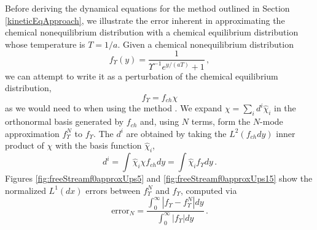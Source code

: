 \label{basisComparison}
Before deriving the dynamical equations for the method outlined in Section \ref{kineticEqApproach}, we illustrate the error inherent in approximating the chemical nonequilibrium distribution   with a  chemical equilibrium distribution  whose temperature is $T=1/a$.   Given a chemical nonequilibrium distribution 
\begin{equation}\label{zerothApprox}
f_\Upsilon (y)=\frac{1}{\Upsilon^{-1}e^{y/(aT)}+1}\,,
\end{equation}
 we can attempt to write it as a perturbation of the chemical equilibrium distribution,  
\begin{equation}\label{chiDef}
f_\Upsilon=f_{ch}\chi
\end{equation} as we would need to when using the method .  We expand $\chi=\sum_i d^i\hat\chi_i$ in the orthonormal basis generated by $f_{ch}$ and, using $N$ terms, form the $N$-mode approximation $f_\Upsilon^N$ to $f_\Upsilon$.  The $d^i$ are obtained by taking the $L^2(f_{ch}dy)$ inner product of $\chi$ with the basis function $\hat\chi_i$,
\begin{equation}
d^i=\int\hat\chi_i \chi f_{ch}dy=\int\hat\chi_i  f_\Upsilon dy\,.
\end{equation}
 Figures \ref{fig:freeStreamf0approxUps5} and \ref{fig:freeStreamf0approxUps15} show the normalized $L^1(dx)$ errors between $f_\Upsilon^N$ and $f_\Upsilon$, computed via
\begin{equation}
\text{error}_N=\frac{\int_0^\infty |f_\Upsilon -f_\Upsilon ^N|dy}{\int_0^\infty |f_\Upsilon |dy}\,.
\end{equation}
